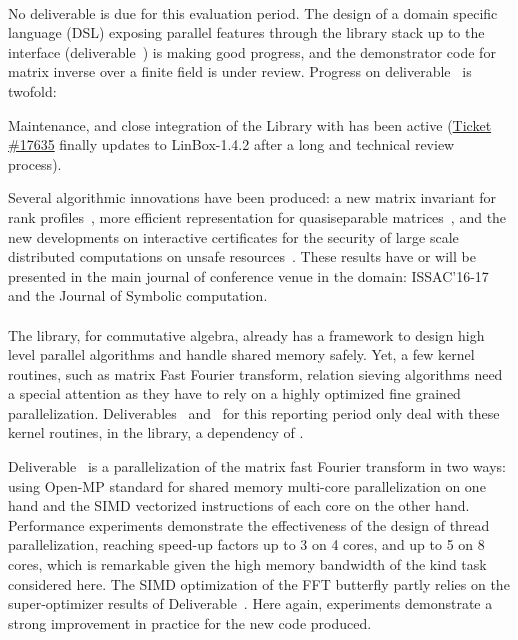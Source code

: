 \documentclass{deliverablereport}
\begin{document}
\paragraph{}

No deliverable
is due for this evaluation period. The design of
a domain specific language (DSL) exposing parallel features through the library
stack up to the \Sage interface (deliverable~) is
making good progress, and the demonstrator code for matrix inverse over a finite field is under review.
%
Progress on deliverable~ is twofold:
\begin{compactitem}
\item Maintenance, and close integration of the Library with \Sage has been
active (\href{https://trac.sagemath.org/ticket/17635}{Ticket \#17635} finally
updates \Sage to LinBox-1.4.2 after a long and technical review process).
\item Several algorithmic innovations have been produced: a new matrix invariant
  for rank profiles~\cite{DumPerSul:fcrpmgbd16}, more efficient
  representation for quasiseparable matrices~\cite{Pernet:cqm16,PerSto:tsegqm17}, and the new developments on
  interactive certificates for the security of large scale distributed
  computations on unsafe
  resources~\cite{DumKalTho:lticmpdsm16,DumLucPer:cftearp17}. These results have or will
  be presented in the main journal of conference venue in the domain:
  ISSAC'16-17 and the Journal of Symbolic computation.
\end{compactitem}

  \paragraph{}

  The \Singular library, for commutative algebra, already has a framework to
  design high level parallel algorithms and handle shared memory safely.
  Yet, a few kernel routines, such as matrix Fast Fourier
  transform, relation  sieving algorithms need a special attention as they have
  to rely on a highly optimized fine grained
  parallelization. Deliverables~
  and~ for this reporting period only deal with these
  kernel routines, in the \FLINT library, a dependency of \Singular.

  Deliverable~ is a parallelization of the matrix fast
  Fourier transform in two ways: using Open-MP standard for shared memory
  multi-core parallelization on one hand and the SIMD vectorized instructions of
  each core on the other hand. Performance experiments demonstrate the
  effectiveness of the design of thread parallelization, reaching speed-up
  factors up to 3 on 4 cores, and up to 5 on 8 cores, which is remarkable given
  the high memory bandwidth of the kind task considered here. The SIMD
  optimization of the FFT butterfly partly relies on the super-optimizer results
  of Deliverable~. Here again, experiments
  demonstrate a strong improvement in practice for the new code produced.
\end{document}
